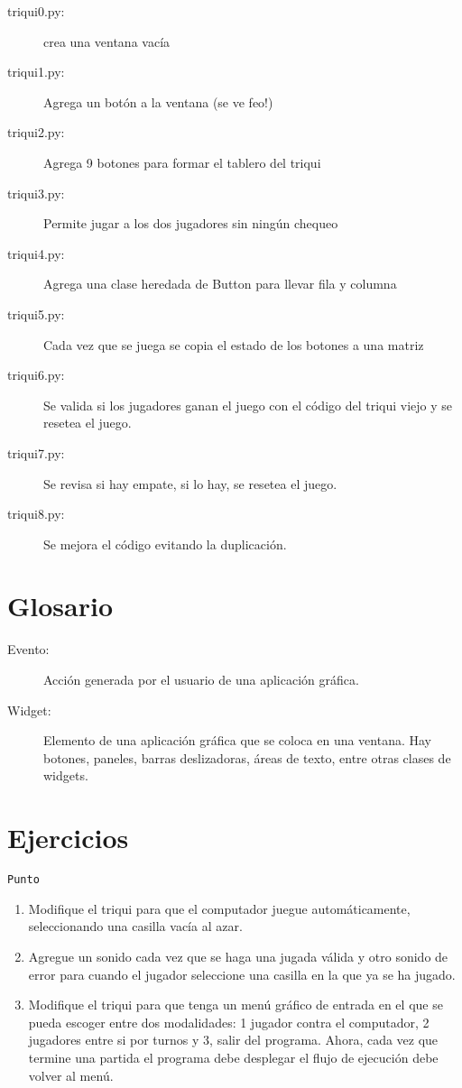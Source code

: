 \begin{description}

\item[triqui0.py:] crea una ventana vacía
\item[triqui1.py:] Agrega un botón a la ventana (se ve feo!)
\item[triqui2.py:] Agrega 9 botones para formar el tablero del triqui
\item[triqui3.py:] Permite jugar a los dos jugadores sin ningún chequeo
\item[triqui4.py:] Agrega una clase heredada de Button para llevar fila y columna 
\item[triqui5.py:] Cada vez que se juega se copia el estado de los botones a una matriz
\item[triqui6.py:] Se valida si los jugadores ganan el juego con el código del triqui viejo
	    y se resetea el juego.
\item[triqui7.py:] Se revisa si hay empate, si lo hay, se resetea el juego.
\item[triqui8.py:] Se mejora el código evitando la duplicación.
\end{description}


\section{Glosario}

\begin{description}

\item[Evento:] Acción generada por el usuario de una aplicación gráfica.

\item[Widget:] Elemento de  una aplicación gráfica que se coloca en una ventana. 
Hay botones, paneles, barras deslizadoras, áreas de texto, entre otras clases
de widgets.

\end{description}

\section{Ejercicios}
\texttt{Punto}

\begin{enumerate}

\item Modifique el triqui para que el computador juegue automáticamente, seleccionando
una casilla vacía al azar. 

\item Agregue un sonido cada vez que se haga una jugada válida y otro sonido de error
para cuando el jugador seleccione una casilla en la que ya se ha jugado.

\item Modifique el triqui para que tenga un menú gráfico de entrada en el que se pueda
escoger entre dos modalidades: 1 jugador contra el computador, 2 jugadores entre si
por turnos y 3, salir del programa. Ahora, cada vez que termine una partida el programa debe desplegar 
el flujo de ejecución debe volver al menú.


\end{enumerate}

